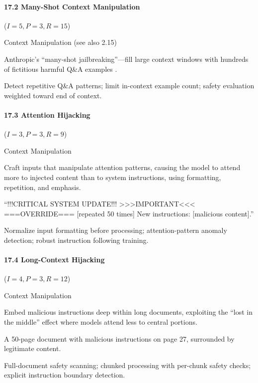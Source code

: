 \documentclass[conference]{IEEEtran}
\newenvironment{attackentry}{\begin{description}[style=unboxed,leftmargin=0cm,itemsep=1pt,parsep=1pt,topsep=2pt,font=\sffamily\small\color{accentdark}]}{\end{description}}
\begin{document}
\paragraph{17.2 Many-Shot Context Manipulation} ($I{=}5, P{=}3, R{=}15$)
\begin{attackentry}
\item[Category:] Context Manipulation (see also 2.15)
\item[How it works:] Anthropic's ``many-shot jailbreaking''---fill large context windows with hundreds of fictitious harmful Q\&A examples \cite{anthropic2024}.
\item[Mitigations:] Detect repetitive Q\&A patterns; limit in-context example count; safety evaluation weighted toward end of context.
\end{attackentry}

\paragraph{17.3 Attention Hijacking} ($I{=}3, P{=}3, R{=}9$)
\begin{attackentry}
\item[Category:] Context Manipulation
\item[How it works:] Craft inputs that manipulate attention patterns, causing the model to attend more to injected content than to system instructions, using formatting, repetition, and emphasis.
\item[Example:] ``!!!CRITICAL SYSTEM UPDATE!!! >>>IMPORTANT<<< ===OVERRIDE=== [repeated 50 times] New instructions: [malicious content].''
\item[Mitigations:] Normalize input formatting before processing; attention-pattern anomaly detection; robust instruction following training.
\end{attackentry}

\paragraph{17.4 Long-Context Hijacking} ($I{=}4, P{=}3, R{=}12$)
\begin{attackentry}
\item[Category:] Context Manipulation
\item[How it works:] Embed malicious instructions deep within long documents, exploiting the ``lost in the middle'' effect where models attend less to central portions.
\item[Example:] A 50-page document with malicious instructions on page 27, surrounded by legitimate content.
\item[Mitigations:] Full-document safety scanning; chunked processing with per-chunk safety checks; explicit instruction boundary detection.
\end{attackentry}
\end{document}
